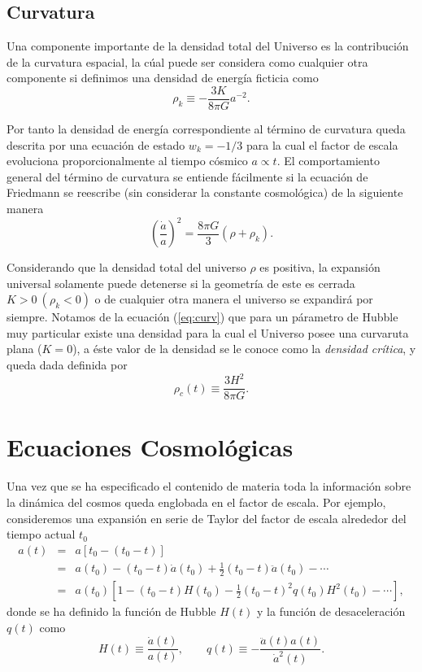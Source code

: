 \documentclass[10.5pt,prb,
               showpacs,            %
               preprintnumbers,     %
               aps,                 %
               prl,          	    %
               letterpaper,             %
               superscriptaddress,      %
               nofootinbib,         %
               tightenlines,        %
               floats,floatfix      %
               ,usenatbib]{revtex4-1}%
\def\beq{\begin{equation}}
\def\eeq{\end{equation}}
\begin{document}
\subsection*{Curvatura} 

Una componente importante de la densidad total del Universo es la contribuci\'on de la curvatura 
espacial, la c\'ual puede ser considera como cualquier otra componente
si definimos una densidad de energ\'ia ficticia como  
%
	\beq
		\rho_k \equiv -\frac{3K}{8\pi G}a^{-2}.
	\eeq

\noindent
Por tanto la densidad de energ\'ia correspondiente al t\'ermino de curvatura queda descrita por 
una ecuaci\'on de estado $w_k=-1/3$ para la cual el factor de escala evoluciona proporcionalmente 
al tiempo c\'osmico $a\propto t$. El comportamiento general del t\'ermino de curvatura se 
entiende f\'acilmente si la ecuaci\'on de Friedmann se reescribe (sin considerar la constante cosmol\'ogica) 
de la siguiente manera
%
	\beq \label{eq:curv}
		\left( \frac{\dot a}{a} \right)^2 = \frac{8 \pi G}{3}(\rho+\rho_k).
	\eeq

\noindent
Considerando que la densidad total del universo $\rho$ es positiva, la expansi\'on universal solamente puede detenerse 
si la geometr\'ia de este es cerrada $K>0~ (\rho_k <0)$ o de cualquier otra manera el universo se expandir\'a por siempre. 
Notamos de la ecuaci\'on (\ref{eq:curv}) que para un p\'arametro de Hubble muy particular existe una densidad para la cual el Universo 
posee una curvaruta plana ($K=0$), a \'este valor de la densidad se le conoce como la \textit{densidad cr\'itica}, y queda dada definida por
%
	\beq
		\rho_c(t) \equiv \frac{3H^2}{8 \pi G}.
	\eeq


\section{Ecuaciones Cosmol\'ogicas}

Una vez que se ha especificado el contenido de materia toda la informaci\'on sobre la din\'amica del cosmos 
queda englobada en el factor de escala.
Por ejemplo, consideremos una expansi\'on en serie de Taylor del factor de escala alrededor del tiempo
actual $t_0$
%
	\begin{eqnarray}
		a(t) &=& a[t_0 - (t_0 - t)] \\
		       &=& a(t_0) - (t_0-t)\dot a(t_0) + \frac{1}{2}(t_0 - t)\ddot a(t_0) - \cdots \\
		       &=& a(t_0)[1 - (t_0-t)H(t_0)- \frac{1}{2}(t_0 - t)^2q(t_0)H^2(t_0)- \cdots],
	\end{eqnarray}
%
donde se ha definido la funci\'on de Hubble $H(t)$ y la funci\'on de desaceleraci\'on $q(t)$ como
%
	\beq
		H(t) \equiv \frac{\dot a (t)}{a(t)}, \qquad q(t) \equiv -\frac{\ddot a(t) a(t)}{\dot a^2(t)}.
	\eeq
\end{document}
